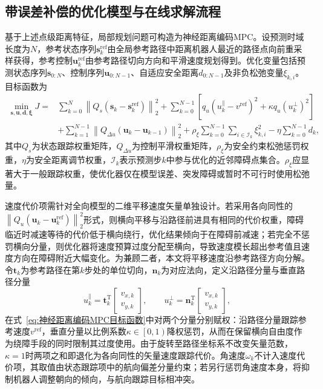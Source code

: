 \subsection{带误差补偿的优化模型与在线求解流程}
基于上述点级距离特征，局部规划问题可构造为神经距离编码MPC。设预测时域长度为$N$，参考状态序列$\mathbf{s}_{k}^{\mathrm{ref}}$由全局参考路径中距离机器人最近的路径点向前重采样获得，参考控制$\mathbf{u}_{k}^{\mathrm{ref}}$由参考路径切向方向和平滑速度规划得到。优化变量包括预测状态序列$\mathbf{s}_{0:N}$、控制序列$\mathbf{u}_{0:N-1}$、自适应安全距离$d_{0:N-1}$及非负松弛变量$\xi_{k,i}$。目标函数为
\begin{align}
	\min_{\mathbf{s},\mathbf{u},\mathbf{d},\boldsymbol{\xi}}
	J
	=&
	\sum_{k=0}^{N}
	\left\|Q_s\left(\mathbf{s}_{k}-\mathbf{s}_{k}^{\mathrm{ref}}\right)\right\|_2^2
	+
	\sum_{k=0}^{N-1}
	\left[
	q_u\left(u_{k}^{\parallel}-v^{\mathrm{ref}}\right)^{2}
	+\kappa q_u\left(u_{k}^{\perp}\right)^{2}
	\right]
	\nonumber\\
	&+
	\sum_{k=1}^{N-1}
	\left\|Q_{\Delta u}\left(\mathbf{u}_{k}-\mathbf{u}_{k-1}\right)\right\|_2^2
	+
	\rho_{\xi}\sum_{k=0}^{N-1}\sum_{i\in\mathcal{I}_k}\xi_{k,i}^{2}
	-
	\eta\sum_{k=0}^{N-1}d_k,
	\label{eq:神经距离编码MPC目标函数}
\end{align}
其中$Q_s$为状态跟踪权重矩阵，$Q_{\Delta u}$为控制平滑权重矩阵，$\rho_{\xi}$为安全约束松弛惩罚权重，$\eta$为安全距离调节权重，$\mathcal{I}_{k}$表示预测步$k$中参与优化的近邻障碍点集合。$\rho_{\xi}$应显著大于一般跟踪权重，使优化器仅在模型误差、突发障碍或暂时不可行时使用松弛量。

速度代价项需针对全向模型的二维平移速度矢量单独设计。若采用各向同性的$\left\|Q_u\left(\mathbf u_k-\mathbf u_k^{\mathrm{ref}}\right)\right\|_2^2$形式，则横向平移与沿路径前进具有相同的代价权重，障碍临近时减速等待的代价低于横向绕行，优化结果倾向于在障碍前减速；若完全不惩罚横向分量，则优化器将速度预算过度分配至横向，导致速度模长超出参考值且速度方向在障碍附近大幅变化。为兼顾二者，本文将平移速度沿参考路径方向分解。令$\mathbf t_k$为参考路径在第$k$步处的单位切向，$\mathbf n_k$为对应法向，定义沿路径分量与垂直路径分量
\begin{equation}
	u_{k}^{\parallel}=\mathbf t_k^{\mathrm T}
	\begin{bmatrix}v_{x,k}\\v_{y,k}\end{bmatrix},
	\qquad
	u_{k}^{\perp}=\mathbf n_k^{\mathrm T}
	\begin{bmatrix}v_{x,k}\\v_{y,k}\end{bmatrix},
	\label{eq:速度路径分解}
\end{equation}
在式~\eqref{eq:神经距离编码MPC目标函数}中对两个分量分别赋权：沿路径分量跟踪参考速度$v^{\mathrm{ref}}$，垂直分量以比例系数$\kappa\in\left[0,1\right)$降权惩罚，从而在保留横向自由度作为绕障手段的同时限制其过度使用。由于旋转至路径坐标系不改变矢量范数，$\kappa=1$时两项之和即退化为各向同性的矢量速度跟踪代价。角速度$\omega_k$不计入速度代价项，其取值由状态跟踪项中的航向偏差分量约束；若另行惩罚角速度本身，将抑制机器人调整朝向的倾向，与航向跟踪目标相冲突。

